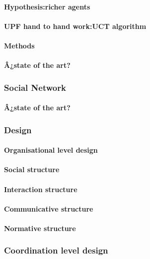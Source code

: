 \documentclass{report}
\begin{document}
				\paragraph{Hypothesis:richer agents}
				\paragraph{UPF hand to hand work:UCT algorithm}
				\paragraph{Methods}
				\paragraph{Â¿state of the art?}

			\subsubsection{Social Network}
				\paragraph{Â¿state of the art?}

			\subsubsection{Design}
				\paragraph{Organisational level design}
				\paragraph{Social structure}
				\paragraph{Interaction structure}
				\paragraph{Communicative structure}
				\paragraph{Normative structure}

			\subsubsection{Coordination level design}
\end{document}
